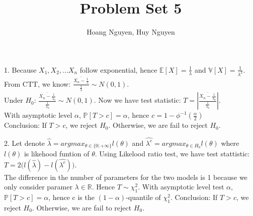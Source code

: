 \documentclass[10pt]{article}
\newenvironment{problem}[2][Problem]{\begin{trivlist}
\item[\hskip \labelsep {\bfseries #1}\hskip \labelsep {\bfseries #2.}]}{\end{trivlist}}
\begin{document}
\title{Problem Set 5}
\author{Hoang Nguyen, Huy Nguyen}
\maketitle
    
\begin{problem}{1}
\item 1.
Because $X_1, X_2,...X_n$ follow exponential, hence $\mathbb{E}[X]=\frac{1}{\lambda}$ and $\mathbb{V}[X]=\frac{1}{\lambda^2}$.\\
From CTT, we know: $\frac{\bar{X_n-\frac{1}{\lambda}}}{\frac{1}{\lambda}} \sim N(0,1)$.\\
Under $H_0$: $\frac{\bar{X_n-\frac{1}{\lambda_0}}}{\frac{1}{\lambda_0}} \sim N(0,1)$. Now we have test statistic: $T= |\frac{\bar{X_n-\frac{1}{\lambda_0}}}{\frac{1}{\lambda_0}}|$.\\
With asymptotic level $\alpha$, $\mathbb{P}[T>c]=\alpha$, hence $c=1-\phi^{-1}(\frac{\alpha}{2})$\\
Conclusion: If $T>c$, we reject $H_0$. Otherwise, we are fail to reject $H_0$.


\item 2. 
Let denote $\hat{\lambda}=argmax_{\theta \in \{0; +\infty\}} l(\theta)$ and $\hat{\lambda^c}=argmax_{\theta \in H_0} l(\theta)$ where $l(\theta)$ is likehood funtion of $\theta$. Using Likelood ratio test, we have test stattistic: $T=2\Big(l(\hat{\lambda})-l(\hat{\lambda^c})\Big)$. \\
The difference in the number of parameters for the two models is 1 because we only consider paramer $\lambda \in \mathbb{R}$. Hence $T \sim \chi_{1}^{2}$. With asymptotic level test $\alpha$, $\mathbb{P}[T>c]=\alpha$, hence c is the $(1-\alpha)$-quantile of $\chi^{2}_{1}$.
Conclusion: If $T>c$, we reject $H_0$. Otherwise, we are fail to reject $H_0$.


\end{problem}
\end{document}
